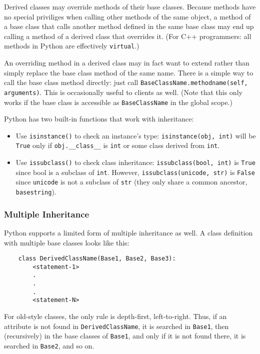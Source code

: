 \documentclass[UTF8]{article}
\begin{document}
Derived classes may override methods of their base classes. Because methods have no special
priviliges when calling other methods of the same object, a method of a base class that calls
another method defined in the same base class may end up calling a method of a derived class that
overrides it. (For C++ programmers: all methods in Python are effectively \texttt{virtual}.)

An overriding method in a derived class may in fact want to extend rather than simply replace the
base class method of the same name. There is a simple way to call the base class method directly:
just call \texttt{BaseClassName.methodname(self, arguments)}. This is occasionally useful to
clients as well. (Note that this only works if the base class is accessible as
\texttt{BaseClassName} in the global scope.)

Python has two built-in functions that work with inheritance:
\begin{itemize}
    \item Use \texttt{isinstance()} to check an instance's type: \texttt{isinstance(obj, int)} will
    be \texttt{True} only if \texttt{obj.\_\_class\_\_} is \texttt{int} or some class derived from
    \texttt{int}.
    \item Use \texttt{issubclass()} to check class inheritance: \texttt{issubclass(bool, int)} is
    \texttt{True} since bool is a subclass of \texttt{int}. However,
    \texttt{issubclass(unicode, str)} is \texttt{False} since \texttt{unicode} is not a subclass of
    \texttt{str} (they only share a common ancestor, \texttt{basestring}).
\end{itemize}

\subsubsection{Multiple Inheritance}
Python supports a limited form of multiple inheritance as well. A class definition with multiple
base classes looks like this:
\begin{verbatim}
    class DerivedClassName(Base1, Base2, Base3):
        <statement-1>
        .
        .
        .
        <statement-N>
\end{verbatim}

For old-style classes, the only rule is depth-first, left-to-right. Thus, if an attribute is not
found in \texttt{DerivedClassName}, it is searched in \texttt{Base1}, then (recursively) in the
base classes of \texttt{Base1}, and only if it is not found there, it is searched in \texttt{Base2},
and so on.
\end{document}
